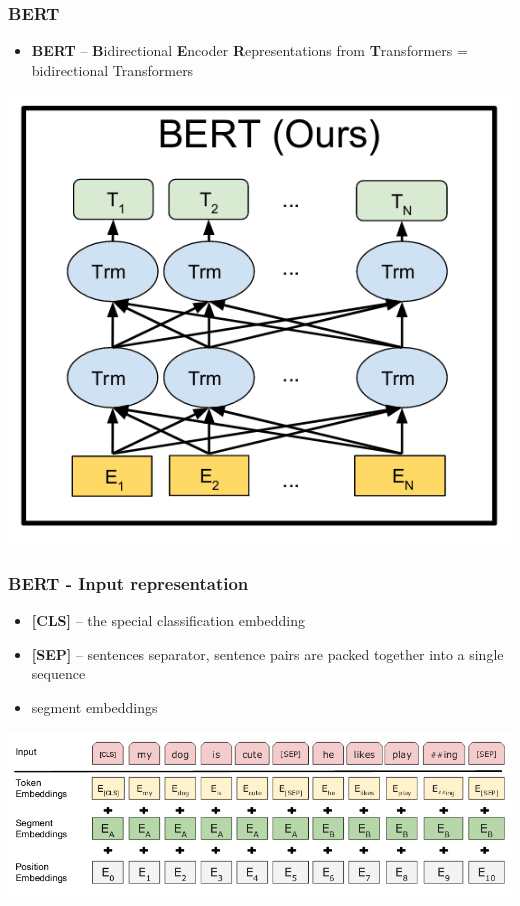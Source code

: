 \documentclass{beamer}
\begin{document}
\begin{frame}
    \frametitle{BERT \cite{bert}}
    \begin{itemize}
        \item \textbf{BERT} -- \textbf{B}idirectional \textbf{E}ncoder \textbf{R}epresentations from \textbf{T}ransformers = bidirectional Transformers
    \end{itemize}
    \begin{center}
        \includegraphics[scale=1.0]{img/bert.png}
    \end{center}
\end{frame}

\begin{frame}
    \frametitle{BERT - Input representation}
    \begin{itemize}
        \item \textbf{[CLS]} -- the special classification embedding
        \item \textbf{[SEP]} -- sentences separator, sentence pairs are packed together into a single sequence
        \item segment embeddings
    \end{itemize}
    \begin{center}
        \includegraphics[scale=1.4]{img/bert_input.png}
    \end{center}
\end{frame}
\end{document}
